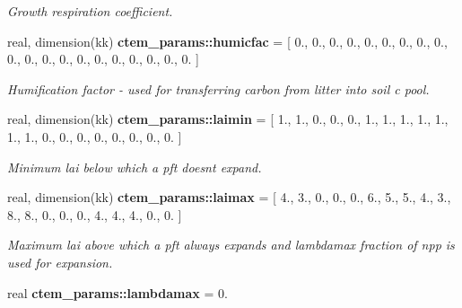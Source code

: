 \begin{DoxyCompactItemize}
\begin{DoxyCompactList}\small\item\em Growth respiration coefficient. \end{DoxyCompactList}\item 
\hypertarget{namespacectem__params_a5c8f0977ee35f251a0c99293d0e91e56}{}real, dimension(kk) {\bfseries ctem\+\_\+params\+::humicfac} = \mbox{[} 0., 0., 0., 0., 0., 0., 0., 0., 0., 0., 0., 0., 0., 0., 0., 0., 0., 0., 0., 0. \mbox{]}\label{namespacectem__params_a5c8f0977ee35f251a0c99293d0e91e56}

\begin{DoxyCompactList}\small\item\em Humification factor -\/ used for transferring carbon from litter into soil c pool. \end{DoxyCompactList}\item 
\hypertarget{namespacectem__params_a7a661dffd51da0f6b8c71a0f71fd2679}{}real, dimension(kk) {\bfseries ctem\+\_\+params\+::laimin} = \mbox{[} 1., 1., 0., 0., 0., 1., 1., 1., 1., 1., 1., 1., 0., 0., 0., 0., 0., 0., 0., 0. \mbox{]}\label{namespacectem__params_a7a661dffd51da0f6b8c71a0f71fd2679}

\begin{DoxyCompactList}\small\item\em Minimum lai below which a pft doesn\textquotesingle{}t expand. \end{DoxyCompactList}\item 
\hypertarget{namespacectem__params_abec8d35477e7996256f26318e666f199}{}real, dimension(kk) {\bfseries ctem\+\_\+params\+::laimax} = \mbox{[} 4., 3., 0., 0., 0., 6., 5., 5., 4., 3., 8., 8., 0., 0., 0., 4., 4., 4., 0., 0. \mbox{]}\label{namespacectem__params_abec8d35477e7996256f26318e666f199}

\begin{DoxyCompactList}\small\item\em Maximum lai above which a pft always expands and lambdamax fraction of npp is used for expansion. \end{DoxyCompactList}\item 
\hypertarget{namespacectem__params_ae7cc598974253bc2df0aeaed4ffea891}{}real {\bfseries ctem\+\_\+params\+::lambdamax} = 0.\label{namespacectem__params_ae7cc598974253bc2df0aeaed4ffea891}


\end{DoxyCompactItemize}
